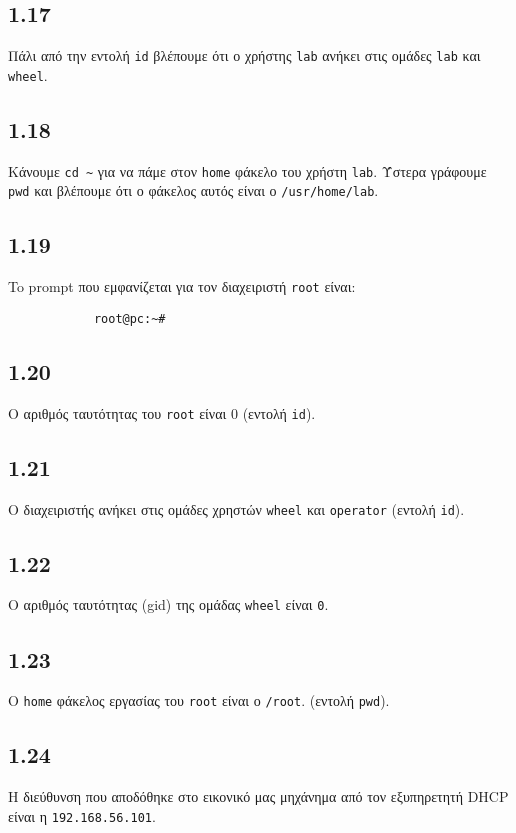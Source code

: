 \documentclass[a4paper, 12pt]{article}
\begin{document}
	\subsection*{1.17}
		Πάλι από την εντολή \verb|id| βλέπουμε ότι ο χρήστης \verb|lab| ανήκει στις ομάδες \verb|lab| και \verb|wheel|.
	
	\subsection*{1.18}
		Κάνουμε \verb|cd ~| για να πάμε στον \verb|home| φάκελο του χρήστη \verb|lab|. Ύστερα γράφουμε \verb|pwd| και βλέπουμε ότι ο φάκελος αυτός είναι ο \verb|/usr/home/lab|.
	
	\subsection*{1.19}
		To prompt που εμφανίζεται για τον διαχειριστή \verb|root| είναι:
		
		\begin{verbatim}
			root@pc:~#
		\end{verbatim}
	
	\subsection*{1.20}
		O αριθμός ταυτότητας του \verb|root| είναι 0 (εντολή \verb|id|).
	
	\subsection*{1.21}
		Ο διαχειριστής ανήκει στις ομάδες χρηστών \verb|wheel| και \verb|operator| (εντολή \verb|id|).
	
	\subsection*{1.22}
		Ο αριθμός ταυτότητας (gid) της ομάδας \verb|wheel| είναι \verb|0|.
	
	\subsection*{1.23}
		Ο \verb|home| φάκελος εργασίας του \verb|root| είναι ο \verb|/root|. (εντολή \verb|pwd|).
	
	\subsection*{1.24}
		Η διεύθυνση που αποδόθηκε στο εικονικό μας μηχάνημα από τον εξυπηρετητή DHCP είναι η \verb|192.168.56.101|.
	
\end{document}
